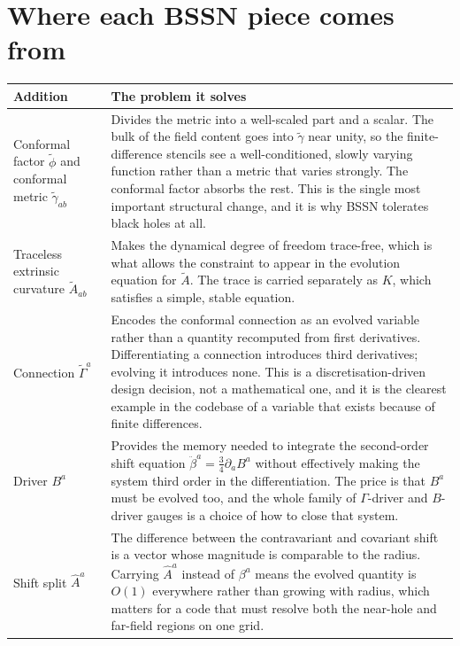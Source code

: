 \documentclass[11pt,openany]{book}
\newcommand{\ph}{\tilde{\phi}}
\newcommand{\At}{\tilde{A}}
\newcommand{\Gt}{\tilde{\Gamma}}
\newcommand{\etr}{\tilde{\gamma}}
\begin{document}
\section{Where each BSSN piece comes from}

\begin{longtable}{@{}p{3.4cm}p{12.2cm}@{}}
\toprule
\textbf{Addition} & \textbf{The problem it solves} \\
\midrule
\endhead
Conformal factor $\ph$ and conformal metric $\etr_{ab}$ &
Divides the metric into a well-scaled part and a scalar. The bulk of the
field content goes into $\etr$ near unity, so the finite-difference stencils
see a well-conditioned, slowly varying function rather than a metric that
varies strongly. The conformal factor absorbs the rest. This is the single
most important structural change, and it is why BSSN tolerates black holes at
all. \\

Traceless extrinsic curvature $\At_{ab}$ &
Makes the dynamical degree of freedom trace-free, which is what allows the
constraint to appear in the evolution equation for $\At$. The trace is carried
separately as $K$, which satisfies a simple, stable equation. \\

Connection $\Gt^a$ &
Encodes the conformal connection as an evolved variable rather than a quantity
recomputed from first derivatives. Differentiating a connection introduces
third derivatives; evolving it introduces none. This is a
discretisation-driven design decision, not a mathematical one, and it is the
clearest example in the codebase of a variable that exists because of
finite differences. \\

Driver $B^a$ &
Provides the memory needed to integrate the second-order shift equation
$\ddot\beta^a = \tfrac34\partial_a B^a$ without effectively making the system
third order in the differentiation. The price is that $B^a$ must be evolved
too, and the whole family of $\Gamma$-driver and $B$-driver gauges is a choice
of how to close that system. \\

Shift split $\hat{A}^a$ &
The difference between the contravariant and covariant shift is a vector whose
magnitude is comparable to the radius. Carrying $\hat{A}^a$ instead of
$\beta^a$ means the evolved quantity is $O(1)$ everywhere rather than growing
with radius, which matters for a code that must resolve both the near-hole and
far-field regions on one grid. \\
\bottomrule
\end{longtable}
\end{document}
